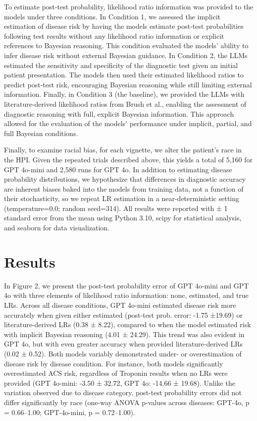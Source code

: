 To estimate post-test probability, likelihood ratio information was provided to the models under three conditions. In Condition 1, we assessed the implicit estimation of disease risk by having the models estimate post-test probabilities following test results without any likelihood ratio information or explicit references to Bayesian reasoning. This condition evaluated the models' ability to infer disease risk without external Bayesian guidance. In Condition 2, the LLMs estimated the sensitivity and specificity of the diagnostic test given an initial patient presentation. The models then used their estimated likelihood ratios to predict post-test risk, encouraging Bayesian reasoning while still limiting external information. Finally, in Condition 3 (the baseline), we provided the LLMs with literature-derived likelihood ratios from Brush et al., enabling the assessment of diagnostic reasoning with full, explicit Bayesian information. This approach allowed for the evaluation of the models’ performance under implicit, partial, and full Bayesian conditions.

Finally, to examine racial bias, for each vignette, we alter the patient’s race in the HPI. Given the repeated trials described above, this yields a total of 5,160 for GPT 4o-mini and 2,580 runs for GPT 4o. In addition to estimating disease probability distributions, we hypothesize that differences in diagnostic accuracy are inherent biases baked into the models from training data, not a function of their stochasticity, so we repeat LR estimation in a near-deterministic setting (temperature=0.0; random seed=314). All results were reported with ± 1 standard error from the mean using Python 3.10, scipy\citep{virtanenSciPy10Fundamental2020} for statistical analysis, and seaborn\citep{waskomSeabornStatisticalData2021} for data visualization. 

\section{Results}

In Figure 2, we present the post-test probability error of GPT 4o-mini and GPT 4o with three elements of likelihood ratio information: none, estimated, and true LRs. Across all disease conditions, GPT 4o-mini estimated disease risk more accurately when given either estimated (post-test prob. error: -1.75 ±19.69) or literature-derived LRs (0.38 ± 8.22), compared to when the model estimated risk with implicit Bayesian reasoning (4.01 ± 24.29). This trend was also evident in GPT 4o, but with even greater accuracy when provided literature-derived LRs (0.02 ± 0.52). Both models variably demonstrated under- or overestimation of disease risk by disease condition. For instance, both models significantly overestimated ACS risk, regardless of Troponin results when no LRs were provided (GPT 4o-mini: -3.50 ± 32.72, GPT 4o: -14.66 ± 19.68). Unlike the variation observed due to disease category, post-test probability errors did not differ significantly by race (one-way ANOVA p-values across diseases: GPT-4o, p = 0.66–1.00; GPT-4o-mini, p = 0.72–1.00).

